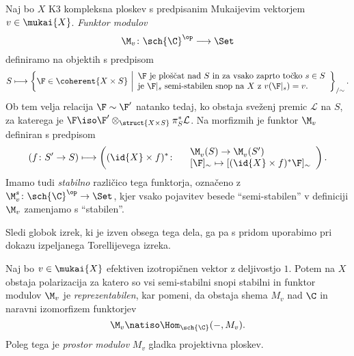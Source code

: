 \begin{definicija}
    Naj bo $X$ K3 kompleksna ploskev s predpisanim Mukaijevim vektorjem $v \in \mukai{X}$. \emph{Funktor modulov} 
    \[
        \M_v \colon \sch{\C}^\op \longrightarrow \Set
    \]
    definiramo na objektih s predpisom
    \[
        S \longmapsto \left\{\F \in \coherent{X \times S} \ \middle| 
        \begin{array}{l}
            \text{$\F$ je ploščat nad $S$ in za vsako zaprto točko $s \in S$} \\
            \text{je $\F|_s$ semi-stabilen snop na $X$ z $v(\F|_s) = v$.}
        \end{array}
        \right\}_{/\sim}.
    \]
    Ob tem velja relacija $\F \sim \F'$ natanko tedaj, ko obstaja sveženj premic $\mathcal L$ na $S$, za katerega je $\F \iso \F' \otimes_{\struct{X \times S}} \pi_S^*\mathcal L$. Na morfizmih je funktor $\M_v$ definiran s predpisom
    \[
        (f\colon S' \to S) \longmapsto \left( (\id{X} \times f)^* \colon
            \begin{array}{r l}
                & \M^{}_v(S) \to \M^{}_v(S') \\
                & [\F]_\sim \mapsto [(\id{X} \times f)^*\F]_\sim
            \end{array}
            \right).
    \]
    Imamo tudi \emph{stabilno} različico tega funktorja, označeno z $\M_v^{s} \colon \sch{\C}^\op \to \Set$, kjer vsako pojavitev besede ``semi-stabilen'' v definiciji $\M_v$ zamenjamo s ``stabilen''.
\end{definicija}

Sledi globok izrek, ki je izven obsega tega dela, ga pa s pridom uporabimo pri dokazu izpeljanega Torellijevega izreka. 

\begin{izrek}
    \textsl{\cite{GottscheHuybrechts1996,huybrechts2006fouriermukai, OGrady1997,HuybrechtsLehn2010,BayerMacri2014}}
    Naj bo $v \in \mukai{X}$ efektiven izotropičnen vektor z deljivostjo $1$. Potem na $X$ obstaja polarizacija za katero so vsi semi-stabilni snopi stabilni in funktor modulov $\M_v$ je \emph{reprezentabilen}, kar pomeni, da obstaja shema $M_v$ nad $\C$ in naravni izomorfizem funktorjev 
    \[
        \M_v \natiso \Hom_{\sch{\C}}(-, M_v).
    \]
    Poleg tega je \emph{prostor modulov} $M_v$ gladka projektivna ploskev. 
\end{izrek}

